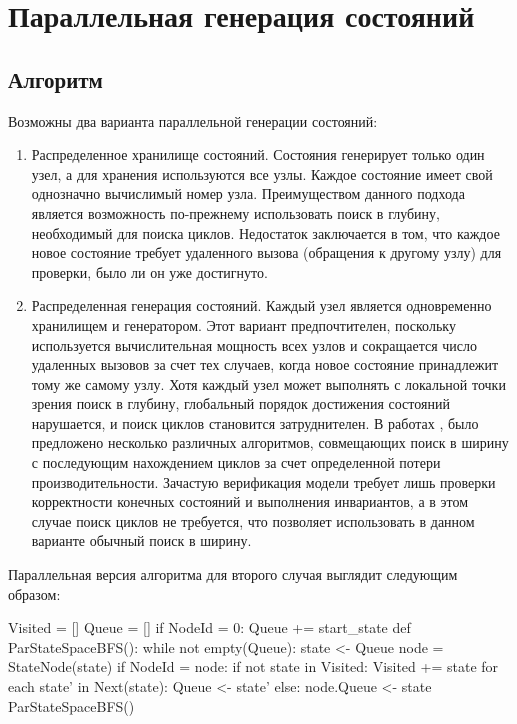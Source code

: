 \chapter{Параллельная генерация состояний}
\label{sec:par-statespace}

\section{Алгоритм}
\label{sec:par-algo}

Возможны два варианта параллельной генерации состояний:

\begin{enumerate}
\item Распределенное хранилище состояний. Состояния генерирует только
  один узел, а для хранения используются все узлы. Каждое состояние
  имеет свой однозначно вычислимый номер узла. Преимуществом данного
  подхода является возможность по-прежнему использовать поиск в
  глубину, необходимый для поиска циклов. Недостаток заключается в
  том, что каждое новое состояние требует удаленного вызова (обращения
  к другому узлу) для проверки, было ли он уже достигнуто.

\item Распределенная генерация состояний. Каждый узел является
  одновременно хранилищем и генератором. Этот вариант предпочтителен,
  поскольку используется вычислительная мощность всех узлов и
  сокращается число удаленных вызовов за счет тех случаев, когда новое
  состояние принадлежит тому же самому узлу. Хотя каждый узел может
  выполнять с локальной точки зрения поиск в глубину, глобальный
  порядок достижения состояний нарушается, и поиск циклов становится
  затруднителен. В работах \cite{DLTL1}, \cite{DLTL2} было предложено
  несколько различных алгоритмов, совмещающих поиск в ширину с
  последующим нахождением циклов за счет определенной потери
  производительности. Зачастую верификация модели требует лишь
  проверки корректности конечных состояний и выполнения инвариантов, а
  в этом случае поиск циклов не требуется, что позволяет использовать
  в данном варианте обычный поиск в ширину.
\end{enumerate}

Параллельная версия алгоритма для второго случая выглядит следующим
образом:

\begin{CodeBlock}
Visited = []
Queue = []
if NodeId = 0:
    Queue += start_state
def ParStateSpaceBFS():
    while not empty(Queue):
        state <- Queue
        node = StateNode(state)
        if NodeId = node:
            if not state in Visited:
                Visited += state
                for each state' in Next(state):
                    Queue <- state'
        else:
            node.Queue <- state
ParStateSpaceBFS()
\end{CodeBlock}

